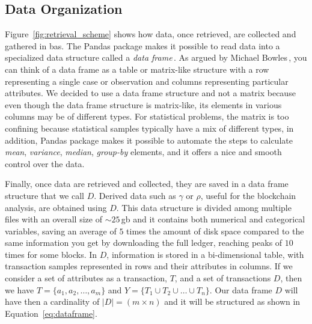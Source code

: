 \documentclass[USenglish]{uit-thesis}
\begin{document}
\subsection{Data Organization}
\label{sec:dataorganization}
Figure~\ref{fig:retrieval_scheme} shows how data,
once retrieved, are collected and gathered
in \gls{bas}.
The Pandas package makes it possible
to read data into a specialized data structure
called a \emph{data frame}\,\cite{pandas}.
As argued by Michael Bowles\,\cite{bowles2015machine},
you can think of a data frame as a table or matrix-like
structure with a row representing a single case
or observation and columns representing particular attributes.
We decided to use a data frame structure and not a
matrix because even though the data frame structure
is matrix-like, its elements in various columns may be of
different types. For statistical problems, the matrix is too
confining because statistical samples typically have a mix
of different types, in addition, Pandas package makes it possible
to automate the steps to calculate \emph{mean}, \emph{variance},
\emph{median}, \emph{group-by} elements, and it
offers a nice and smooth control over the data. 

Finally, once data are
retrieved and collected, they are saved in a data frame
structure that we call $D$.
Derived data such as $\gamma$ or $\rho$,
useful for the blockchain analysis, are obtained using $D$.
This data structure is divided among multiple files
with an overall size of $\sim$$25$\,\gls{gb} and it contains
both numerical and categorical variables, saving an average
of $5$ times the amount of disk space compared to the same
information you get by downloading the full ledger,
reaching peaks of $10$ times for some blocks.
In $D$, information is stored in a bi-dimensional table,
with transaction samples represented in
rows and their attributes in columns.
If we consider a set of attributes as a transaction, $T$,
and a set of transactions $D$, then we have
$
T = \{ a_1, a_2, \dots, a_m \}
$
and
$
Y = \{ T_1 \cup T_2 \cup \dots \cup T_n \}.
$
Our data frame $D$ will have then a cardinality of $|D| = (m \times n)$
and it will be structured as shown in Equation~\ref{eq:dataframe}.
\end{document}
